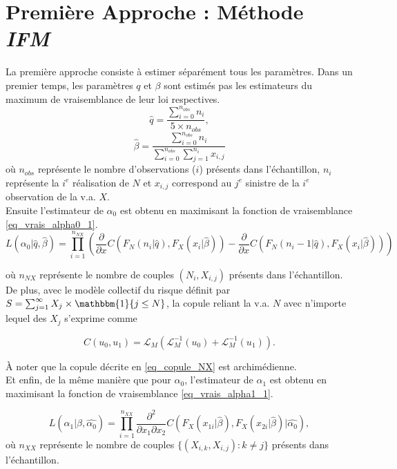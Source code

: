 \documentclass[11pt]{article}
\begin{document}
\section{Première Approche : Méthode \textit{IFM}}
	
	La première approche consiste à estimer séparément tous les paramètres. Dans un premier temps, les paramètres $q$ et $\beta$ sont estimés pas les estimateurs du maximum de vraisemblance de leur loi respectives. 
	\[ \hat{q} = \frac{\sum^{n_{obs}}_{i=0} n_{i}}{5\times n_{obs}}, \]
	\[ \hat{\beta} = \frac{\sum^{n_{obs}}_{i=0} n_i}{\sum^{n_{obs}}_{i=0} \sum_{j=1}^{n_i} x_{i,j}} \]
	où $n_{obs}$ représente le nombre d'observations ($i$) présents dans l'échantillon, $n_i$ représente la $i^e$ réalisation de $N$ et $x_{i,j}$ correspond au $j^e$ sinistre de la $i^e$ observation de la v.a. $X$.\\
	
	Ensuite l'estimateur de $\alpha_{0}$ est obtenu en maximisant la fonction de vraisemblance \eqref{eq_vrais_alpha0_1}.
	\begin{equation}\label{eq_vrais_alpha0_1}
		L(\alpha_{0} \vert \hat{q},\hat{\beta}) = \prod^{n_{NX}}_{i=1} \left(\frac{\partial}{\partial x} C(F_{N}(n_{i} \vert \hat{q}),F_{X}(x_{i} \vert \hat{\beta})) - \frac{\partial}{\partial x} C(F_{N}(n_{i}-1 \vert \hat{q}),F_{X}(x_{i} \vert \hat{\beta}))\right)
	\end{equation}

	où $n_{NX}$ représente le nombre de couples $(N_{i},X_{i,j})$ présents dans l'échantillon.\\
	
	De plus, avec le modèle collectif du risque définit par $S= \sum_{j=1}^{\infty} X_{j} \times \mathbbm{1}\{j \leq N\}$, la copule reliant la v.a. $N$ avec n'importe lequel des $X_{j}$ s'exprime comme
	
	\begin{equation}\label{eq_copule_NX}
		C(u_{0},u_{1}) = \mathscr{L}_{M}(\mathscr{L}_{M}^{-1}(u_{0}) + \mathscr{L}_{M}^{-1}(u_{1}) ).
	\end{equation}

	À noter que la copule décrite en \eqref{eq_copule_NX} est archimédienne.\\
	
	Et enfin, de la même manière que pour $\alpha_{0}$, l'estimateur de $\alpha_{1}$ est obtenu en maximisant la fonction de vraisemblance \eqref{eq_vrais_alpha1_1}.
	
	\begin{equation}\label{eq_vrais_alpha1_1}
		L(\alpha_{1} \vert \hat{\beta},\hat{\alpha_{0}}) = \prod^{n_{XX}}_{i=1} \frac{\partial^2}{\partial x_{1}\partial x_{2}} C(F_{X}(x_{1i} \vert \hat{\beta}),F_{X}(x_{2i}\vert \hat{\beta}) \vert \hat{\alpha_{0}}),
	\end{equation}
	où $n_{XX}$ représente le nombre de couples $\{(X_{i,k},X_{i,j}): k \neq j\}$ présents dans l'échantillon.
	
\end{document}
